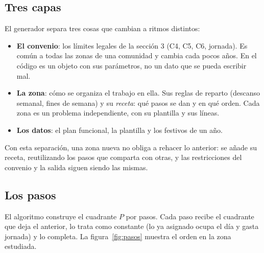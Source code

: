 \documentclass[11pt,a4paper]{article}
\begin{document}
\subsection{Tres capas}

El generador separa tres cosas que cambian a ritmos distintos:
\begin{itemize}[nosep]
  \item \textbf{El convenio}: los límites legales de la sección 3 (C4, C5, C6, jornada). Es
        común a todas las zonas de una comunidad y cambia cada pocos años. En el código es un
        objeto con sus parámetros, no un dato que se pueda escribir mal.
  \item \textbf{La zona}: cómo se organiza el trabajo en ella. Sus reglas de reparto (descanso
        semanal, fines de semana) y su \emph{receta}: qué pasos se
        dan y en qué orden. Cada zona es un problema independiente, con su plantilla y sus
        líneas.
  \item \textbf{Los datos}: el plan funcional, la plantilla y los festivos de un año.
\end{itemize}
Con esta separación, una zona nueva no obliga a rehacer lo anterior: se añade su receta,
reutilizando los pasos que comparta con otras, y las restricciones del convenio y la salida
siguen siendo las mismas.

\subsection{Los pasos}

El algoritmo construye el cuadrante $P$ por pasos. Cada paso recibe el cuadrante que deja el
anterior, lo trata como constante (lo ya asignado ocupa el día y gasta jornada) y lo completa.
La figura~\ref{fig:pasos} muestra el orden en la zona estudiada.
\end{document}
